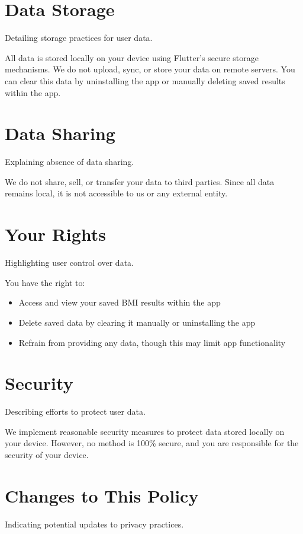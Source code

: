 \documentclass[a4paper,12pt]{article}
\begin{document}
\section*{Data Storage}
Detailing storage practices for user data.

All data is stored locally on your device using Flutter's secure storage mechanisms. We do not upload, sync, or store your data on remote servers. You can clear this data by uninstalling the app or manually deleting saved results within the app.

\section*{Data Sharing}
Explaining absence of data sharing.

We do not share, sell, or transfer your data to third parties. Since all data remains local, it is not accessible to us or any external entity.

\section*{Your Rights}
Highlighting user control over data.

You have the right to:
\begin{itemize}
    \item Access and view your saved BMI results within the app
    \item Delete saved data by clearing it manually or uninstalling the app
    \item Refrain from providing any data, though this may limit app functionality
\end{itemize}

\section*{Security}
Describing efforts to protect user data.

We implement reasonable security measures to protect data stored locally on your device. However, no method is 100\% secure, and you are responsible for the security of your device.

\section*{Changes to This Policy}
Indicating potential updates to privacy practices.
\end{document}
